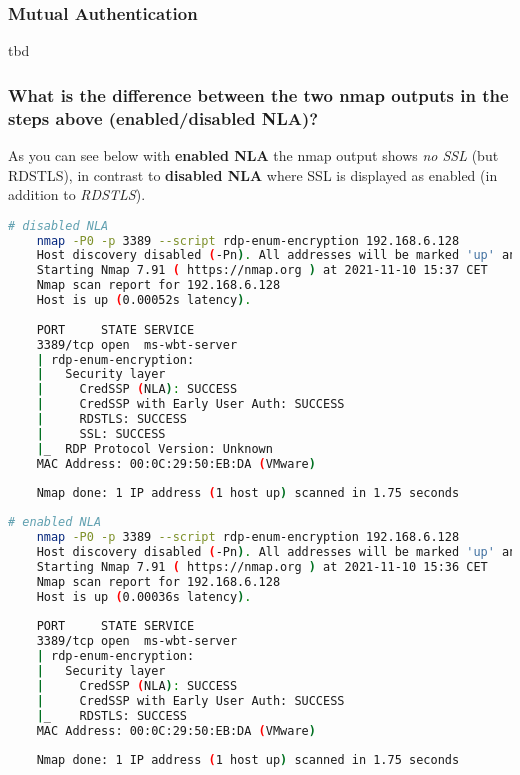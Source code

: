 \subsubsection{Mutual Authentication}
tbd

\subsubsection{What is the difference between the two nmap outputs in the steps above (enabled/disabled NLA)?}
As you can see below with \textbf{enabled NLA} the nmap output shows \textit{no SSL} (but RDSTLS), in contrast to \textbf{disabled NLA} where SSL is displayed as enabled (in addition to \textit{RDSTLS}).

\begin{lstlisting}[language=bash]
    # disabled NLA
    nmap -P0 -p 3389 --script rdp-enum-encryption 192.168.6.128
    Host discovery disabled (-Pn). All addresses will be marked 'up' and scan times will be slower.
    Starting Nmap 7.91 ( https://nmap.org ) at 2021-11-10 15:37 CET
    Nmap scan report for 192.168.6.128
    Host is up (0.00052s latency).
    
    PORT     STATE SERVICE
    3389/tcp open  ms-wbt-server
    | rdp-enum-encryption:
    |   Security layer
    |     CredSSP (NLA): SUCCESS
    |     CredSSP with Early User Auth: SUCCESS
    |     RDSTLS: SUCCESS
    |     SSL: SUCCESS
    |_  RDP Protocol Version: Unknown
    MAC Address: 00:0C:29:50:EB:DA (VMware)
    
    Nmap done: 1 IP address (1 host up) scanned in 1.75 seconds
\end{lstlisting}

\begin{lstlisting}[language=bash]
    # enabled NLA
    nmap -P0 -p 3389 --script rdp-enum-encryption 192.168.6.128
    Host discovery disabled (-Pn). All addresses will be marked 'up' and scan times will be slower.
    Starting Nmap 7.91 ( https://nmap.org ) at 2021-11-10 15:36 CET
    Nmap scan report for 192.168.6.128
    Host is up (0.00036s latency).
    
    PORT     STATE SERVICE
    3389/tcp open  ms-wbt-server
    | rdp-enum-encryption:
    |   Security layer
    |     CredSSP (NLA): SUCCESS
    |     CredSSP with Early User Auth: SUCCESS
    |_    RDSTLS: SUCCESS
    MAC Address: 00:0C:29:50:EB:DA (VMware)
    
    Nmap done: 1 IP address (1 host up) scanned in 1.75 seconds
\end{lstlisting}

